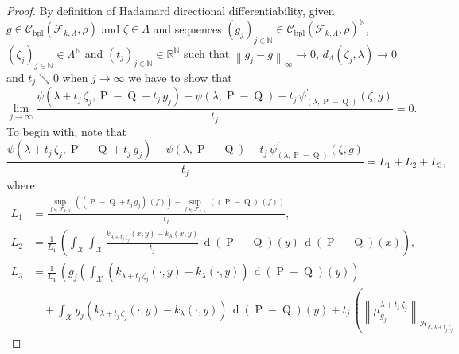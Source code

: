 	\begin{proof}
		By definition of Hadamard directional differentiability, given $g\in\mathcal{C}_{\operatorname{bpl}}\left(\mathcal{F}_{k,\Lambda},\rho\right)$ and $\zeta\in\Lambda$ and sequences $\left(g_{j}\right)_{j\in\mathbb{N}}\in\mathcal{C}_{\operatorname{bpl}}\left(\mathcal{F}_{k,\Lambda},\rho\right)^{\mathbb{N}}$, $\left(\zeta_{j}\right)_{j\in\mathbb{N}}\in\Lambda^{\mathbb{N}}$ and $\left(t_{j}\right)_{j\in\mathbb{N}}\in\mathbb{R}^{\mathbb{N}}$ such that $\left\|g_{j}-g\right\|_{\infty}\longrightarrow0$, $d_{\Lambda}\left(\zeta_{j},\lambda\right)\longrightarrow0$ and $t_{j}\searrow0$ when $j\longrightarrow\infty$ we have to show that
		\begin{equation}
			\lim_{j\longrightarrow\infty}\frac{\psi\left(\lambda+t_{j}\,\zeta_{j},\operatorname{P}-\operatorname{Q}+t_{j}\,g_{j}\right)-\psi(\lambda,\operatorname{P}-\operatorname{Q})-t_{j}\,\psi_{(\lambda,\operatorname{P}-\operatorname{Q})}^{\prime}\left(\zeta,g\right)}{t_{j}}=0.
		\end{equation}
		To begin with, note that
		\begin{equation}
			\frac{\psi\left(\lambda+t_{j}\,\zeta_{j},\operatorname{P}-\operatorname{Q}+t_{j}\,g_{j}\right)-\psi(\lambda,\operatorname{P}-\operatorname{Q})-t_{j}\,\psi_{(\lambda,\operatorname{P}-\operatorname{Q})}^{\prime}\left(\zeta,g\right)}{t_{j}}=L_{1}+L_{2}+L_{3},
		\end{equation}
		where
		\begin{equation}
			\begin{aligned}
				L_{1}&=\frac{\underset{f\in\mathcal{F}_{k,\lambda}}{\operatorname{sup}}\,\left(\left(\operatorname{P}-\operatorname{Q}+t_{j}\,g_{j}\right)\,(f)\right)-\underset{f\in\mathcal{F}_{k,\lambda}}{\operatorname{sup}}\,\left(\left(\operatorname{P}-\operatorname{Q}\right)\,(f)\right)}{t_{j}},
				\\
				L_{2}&=\frac{1}{L_{4}}\,\left(\int_{\mathcal{X}}\int_{\mathcal{X}}\frac{k_{\lambda+t_{j}\,\zeta_{j}}(x,y)-k_{\lambda}(x,y)}{t_{j}}\,\operatorname{d}(\operatorname{P}-\operatorname{Q})(y)\,\operatorname{d}(\operatorname{P}-\operatorname{Q})(x)\right),
				\\
				L_{3}&=\frac{1}{L_{4}}\,\left(g_{j}\left(\int_{\mathcal{X}}\left(k_{\lambda+t_{j}\,\zeta_{j}}(\cdot,y)-k_{\lambda}(\cdot,y)\right)\,\operatorname{d}(\operatorname{P}-\operatorname{Q})(y)\right)\right.
				\\
				&\quad+\int_{\mathcal{X}}g_{j}\left(k_{\lambda+t_{j}\,\zeta_{j}}(\cdot,y)-k_{\lambda}(\cdot,y)\right)\,\operatorname{d}(\operatorname{P}-\operatorname{Q})(y)+t_{j}\,\left(\left\|\mu_{g_{j}}^{\lambda+t_{j}\,\zeta_{j}}\right\|_{\mathcal{H}_{k,\lambda+t_{j}\,\zeta_{j}}}\right.

\end{aligned}
\end{equation}
\end{proof}
